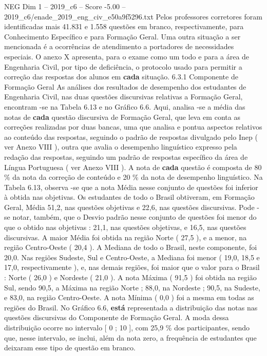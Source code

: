\begin{textsample}{NEG Dim 1 – 2019\_c6 – Score -5.00 – 2019\_c6/enade\_2019\_eng\_civ\_e50a9f5296.txt}
Pelos professores corretores foram identificadas mais 41.831 e 1.558 questões em branco, respectivamente, para Conhecimento Específico e para Formação Geral.
Uma outra situação a ser mencionada é a ocorrências de atendimento a portadores de necessidades especiais.
O anexo X apresenta, para o exame como um todo e para a área de Engenharia Civil, por tipo de deficiência, o protocolo usado para permitir a correção das respostas dos alunos em \textbf{cada} situação. 6.3.1 Componente de Formação Geral As análises dos resultados de desempenho dos estudantes de Engenharia Civil, nas duas questões discursivas relativas a Formação Geral, encontram -se na Tabela 6.13 e no Gráfico 6.6.
Aqui, analisa -se a média das notas de \textbf{cada} questão discursiva de Formação Geral, que leva em conta as correções realizadas por duas bancas, uma que analisa e pontua aspectos relativos ao conteúdo das respostas, seguindo o padrão de respostas divulgado pelo Inep ( ver Anexo VIII ), outra que avalia o desempenho linguístico expresso pela redação das respostas, seguindo um padrão de respostas específico da área de Língua Portuguesa ( ver Anexo VIII ).
A nota de \textbf{cada} questão é composta de 80 \% da nota da correção de conteúdo e 20 \% da nota de desempenho linguístico.
Na Tabela 6.13, observa -se que a nota Média nesse conjunto de questões foi inferior à obtida nas objetivas.
Os estudantes de todo o Brasil obtiveram, em Formação Geral, Média 51,2, nas questões objetivas e 22,6, nas questões discursivas.
Pode -se notar, também, que o Desvio padrão nesse conjunto de questões foi menor do que o obtido nas objetivas : 21,1, nas questões objetivas, e 16,5, nas questões discursivas.
A maior Média foi obtida na região Norte ( 27,5 ), e a menor, na região Centro-Oeste ( 20,4 ).
A Mediana de todo o Brasil, neste componente, foi 20,0.
Nas regiões Sudeste, Sul e Centro-Oeste, a Mediana foi menor ( 19,0, 18,5 e 17,0, respectivamente ), e, nas demais regiões, foi maior que o valor para o Brasil : Norte ( 26,0 ) e Nordeste ( 21,0 ).
A nota Máxima ( 91,5 ) foi obtida na região Sul, sendo 90,5, a Máxima na região Norte ; 88,0, na Nordeste ; 90,5, na Sudeste, e 83,0, na região Centro-Oeste.
A nota Mínima ( 0,0 ) foi a mesma em todas as regiões do Brasil.
No Gráfico 6.6, \textbf{está} representada a distribuição das notas nas questões discursivas do Componente de Formação Geral.
A moda dessa distribuição ocorre no intervalo [ 0 ; 10 ], com 25,9 \% dos participantes, sendo que, nesse intervalo, se inclui, além da nota zero, a frequência de estudantes que deixaram esse tipo de questão em branco.

\end{textsample}
